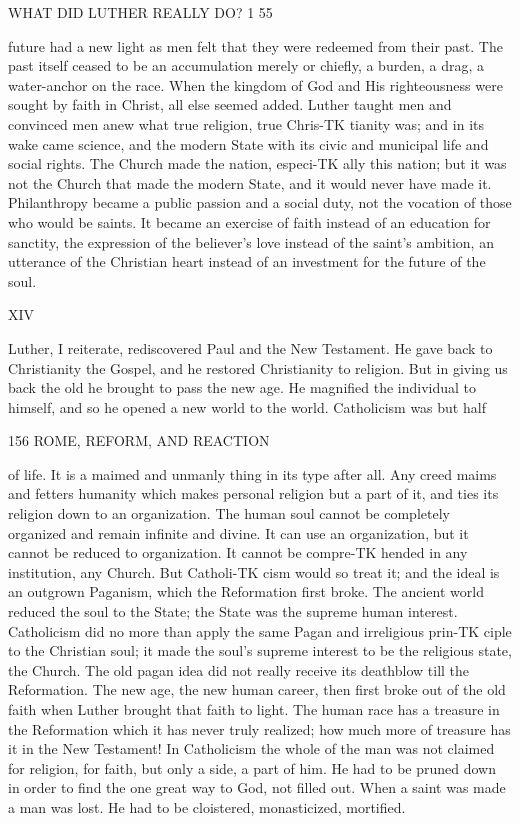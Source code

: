 \documentclass[12pt,a5paper,twoside]{book}
\begin{document}
{WHAT DID LUTHER REALLY DO? 1 55 

future had a new light as men felt that they were 
redeemed from their past. The past itself ceased to 
be an accumulation merely or chiefly, a burden, a drag, 
a water-anchor on the race. When the kingdom of 
God and His righteousness were sought by faith in 
Christ, all else seemed added. Luther taught men and 
convinced men anew what true religion, true Chris-TK
tianity was; and in its wake came science, and the 
modern State with its civic and municipal life and 
social rights. The Church made the nation, especi-TK
ally this nation; but it was not the Church that made 
the modern State, and it would never have made it. 
Philanthropy became a public passion and a social 
duty, not the vocation of those who would be saints. 
It became an exercise of faith instead of an education 
for sanctity, the expression of the believer's love 
instead of the saint's ambition, an utterance of the 
Christian heart instead of an investment for the future 
of the soul. 

XIV 

Luther, I reiterate, rediscovered Paul and the New 
Testament. He gave back to Christianity the Gospel, 
and he restored Christianity to religion. But in giving 
us back the old he brought to pass the new age. He 
magnified the individual to himself, and so he opened 
a new world to the world. Catholicism was but half 



156 ROME, REFORM, AND REACTION 

of life. It is a maimed and unmanly thing in its type 
after all. Any creed maims and fetters humanity 
which makes personal religion but a part of it, and ties 
its religion down to an organization. The human soul 
cannot be completely organized and remain infinite 
and divine. It can use an organization, but it cannot 
be reduced to organization. It cannot be compre-TK
hended in any institution, any Church. But Catholi-TK
cism would so treat it; and the ideal is an outgrown 
Paganism, which the Reformation first broke. The 
ancient world reduced the soul to the State; the State 
was the supreme human interest. Catholicism did no 
more than apply the same Pagan and irreligious prin-TK
ciple to the Christian soul; it made the soul's supreme 
interest to be the religious state, the Church. The 
old pagan idea did not really receive its deathblow till 
the Reformation. The new age, the new human 
career, then first broke out of the old faith when 
Luther brought that faith to light. The human race 
has a treasure in the Reformation which it has never 
truly realized; how much more of treasure has it in 
the New Testament! In Catholicism the whole of 
the man was not claimed for religion, for faith, but 
only a side, a part of him. He had to be pruned 
down in order to find the one great way to God, not 
filled out. When a saint was made a man was lost. 
He had to be cloistered, monasticized, mortified. 



}
\end{document}

